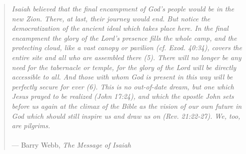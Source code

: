 \documentclass[11pt]{article}
\begin{document}
\begin{quote}
\textit{
    Isaiah believed that the final encampment of God's people would be in the new Zion. There, at last, their journey would end. But notice the democratization of the ancient ideal which takes place here. In the final encampment the glory of the Lord's presence fills the whole camp, and the protecting cloud, like a vast canopy or pavilion (cf. Exod. 40:34), covers the entire site and all who are assembled there (5). There will no longer be any need for the tabernacle or temple, for the glory of the Lord will be directly accessible to all. And those with whom God is present in this way will be perfectly secure for ever (6). This is no out-of-date dream, but one which Jesus prayed to be realized (John 17:24), and which the apostle John sets before us again at the climax of the Bible as the vision of our own future in God which should still inspire us and draw us on (Rev. 21:22-27). We, too, are pilgrims.
}
\\\\
\hfill --- Barry Webb, \textit{The Message of Isaiah}
\end{quote}

{\vspace{1em}}
\end{document}
